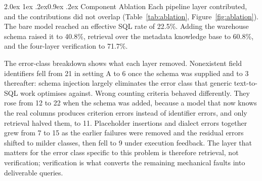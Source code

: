 \documentclass[10pt]{article}
\makeatletter
\renewcommand\subsection{\@startsection{subsection}{2}{\z@}%
  {2.0ex \@plus 1ex \@minus .2ex}{0.9ex \@plus .2ex}%
  {\normalfont\normalsize\bfseries}}
\makeatother
\begin{document}
\subsection{Component Ablation}
Each pipeline layer contributed, and the contributions did not overlap
(Table~\ref{tab:ablation}, Figure~\ref{fig:ablation}). The bare model reached an effective SQL rate of
22.5\%. Adding the warehouse schema raised it to 40.8\%, retrieval over the
metadata knowledge base to 60.8\%, and the four-layer verification to 71.7\%.

The error-class breakdown shows what each layer removed. Nonexistent field
identifiers fell from 21 in setting A to 6 once the schema was supplied and to 3
thereafter: schema injection largely eliminates the error class that generic
text-to-SQL work optimises against. Wrong counting criteria behaved differently.
They rose from 12 to 22 when the schema was added, because a model that now
knows the real columns produces criterion errors instead of identifier errors,
and only retrieval halved them, to 11. Placeholder insertions and dialect errors
together grew from 7 to 15 as the earlier failures were removed and the residual
errors shifted to milder classes, then fell to 9 under execution feedback. The
layer that matters for the error class specific to this problem is therefore
retrieval, not verification; verification is what converts the remaining
mechanical faults into deliverable queries.
\end{document}
